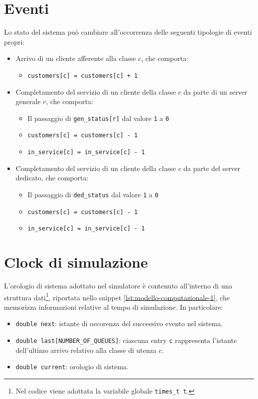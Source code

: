 \section{Eventi}\label{sec:modello-computazionale-eventi}
Lo stato del sistema può cambiare all'occorrenza delle seguenti tipologie di eventi propri:
\begin{itemize}
\item Arrivo di un cliente afferente alla classe $c$, che comporta:
\begin{itemize}
\item \texttt{customers[c] = customers[c] + 1}
\end{itemize}
\newpage
\item Completamento del servizio di un cliente della classe $c$ da parte di un server generale $r$, che comporta:
\begin{itemize}
\item Il passaggio di \texttt{gen\_status[r]} dal valore \texttt{1} a \texttt{0}
\item \texttt{customers[c] = customers[c] - 1}
\item \texttt{in\_service[c] = in\_service[c] - 1}
\end{itemize}
\item Completamento del servizio di un cliente della classe $c$ da parte del server dedicato, che comporta:
\begin{itemize}
\item Il passaggio di \texttt{ded\_status} dal valore \texttt{1} a \texttt{0}
\item \texttt{customers[c] = customers[c] - 1}
\item \texttt{in\_service[c] = in\_service[c] - 1}
\end{itemize}
\end{itemize} 
\section{Clock di simulazione}\label{sec:modello-computazionale-clock}
L'orologio di sistema adottato nel simulatore è contenuto all'interno di una struttura dati\footnote{Nel codice viene adottata la variabile globale \texttt{{\color{code_purple}times\_t} t}.}, riportata nello snippet \ref{lst:modello-computazionale-1}, che memorizza informazioni relative al tempo di simulazione. In particolare:
\begin{itemize}
\item \texttt{{\color{code_purple}double} next}: istante di occorenza del successivo evento nel sistema.
\item \texttt{{\color{code_purple}double} last[NUMBER\_OF\_QUEUES]}: ciascuna entry \texttt{c} rappresenta l'istante dell'ultimo arrivo relativo alla classe di utenza $c$.
\item \texttt{{\color{code_purple}double} current}: orologio di sistema.
\end{itemize}

